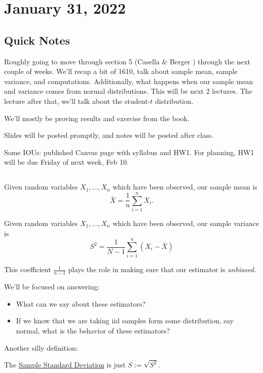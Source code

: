 \section{January 31, 2022}
\subsection{Quick Notes}
Roughly going to move through section 5 (Casella \& Berger \cite{casella2002statistical}) through the next couple of weeks. We'll recap a bit of 1610, talk about sample mean, sample variance, and computations. Additionally, what happens when our sample mean and variance comes from normal distributions. This will be next 2 lectures. The lecture after that, we'll talk about the student-$t$ distribution.

We'll mostly be proving results and exercise from the book.

Slides will be posted promptly, and notes will be posted after class.

Some IOUs: published Canvas page with syllabus and HW1. For planning, HW1 will be due Friday of next week, Feb 10.

\subsection{}
\begin{definition}
    Given random variables $X_1, \dots, X_n$ which have been observed, our sample mean is
    \[\bar X = \frac{1}{n}\sum^n_{i=1}X_i.\]
\end{definition}
\begin{definition}
    Given random variables $X_1, \dots, X_n$ which have been observed, our sample variance is
    \[S^2 = \frac{1}{N-1}\sum^n_{i=1}(X_i - \bar X)\]
\end{definition}
This coefficient $\frac{1}{n-1}$ plays the role in making sure that our estimator is \emph{unbiased}.

We'll be focused on answering:
\begin{itemize}
    \item What can we say about these estimators?
    \item If we know that we are taking iid samples form some distribution, say normal, what is the behavior of these estimators?
\end{itemize}

Another silly definition:
\begin{definition}
    The \ul{Sample Standard Deviation} is just $S := \sqrt{S^2}$.
\end{definition}

